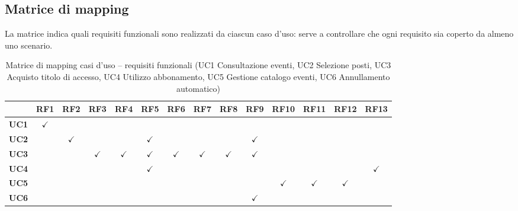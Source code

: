 \subsection{Matrice di mapping}
\label{sec:matrice}

La matrice indica quali requisiti funzionali sono realizzati da ciascun caso d'uso: serve a controllare che ogni requisito sia coperto da almeno uno scenario.

\begin{table}[H]
\centering
\small
\setlength{\tabcolsep}{4pt}
\renewcommand{\arraystretch}{1.5}
\begin{tabular}{|l|c|c|c|c|c|c|c|c|c|c|c|c|c|}
\hline
 & \textbf{RF1} & \textbf{RF2} & \textbf{RF3} & \textbf{RF4} & \textbf{RF5} & \textbf{RF6} & \textbf{RF7} & \textbf{RF8} & \textbf{RF9} & \textbf{RF10} & \textbf{RF11} & \textbf{RF12} & \textbf{RF13} \\
\hline
\textbf{UC1} & $\checkmark$ &  &  &  &  &  &  &  &  &  &  &  &  \\ \hline
\textbf{UC2} &  & $\checkmark$ &  &  & $\checkmark$ &  &  &  & $\checkmark$ &  &  &  &  \\ \hline
\textbf{UC3} &  &  & $\checkmark$ & $\checkmark$ & $\checkmark$ & $\checkmark$ & $\checkmark$ & $\checkmark$ & $\checkmark$ &  &  &  &  \\ \hline
\textbf{UC4} &  &  &  &  & $\checkmark$ &  &  &  &  &  &  &  & $\checkmark$ \\ \hline
\textbf{UC5} &  &  &  &  &  &  &  &  &  & $\checkmark$ & $\checkmark$ & $\checkmark$ &  \\ \hline
\textbf{UC6} &  &  &  &  &  &  &  &  & $\checkmark$ &  &  &  &  \\ \hline
\end{tabular}
\caption{Matrice di mapping casi d'uso -- requisiti funzionali (UC1 Consultazione eventi, UC2 Selezione posti, UC3 Acquisto titolo di accesso, UC4 Utilizzo abbonamento, UC5 Gestione catalogo eventi, UC6 Annullamento automatico)}
\label{tab:matrice}
\end{table}

